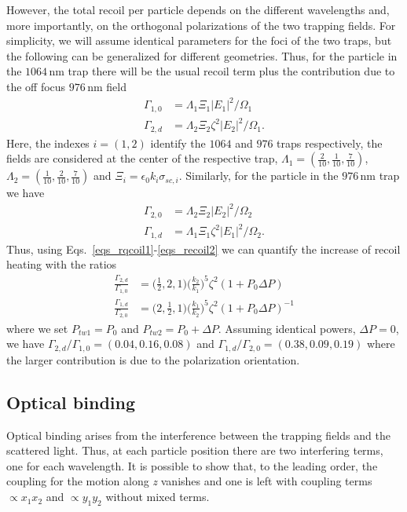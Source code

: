 \documentclass[aps,PRA,%
 amsmath,amssymb,
singlecolumn,
notitlepage,superscriptaddress,groupedaddress]{revtex4}
\begin{document}
However, the total recoil per particle depends on the different wavelengths and, more importantly, on the orthogonal polarizations of the two trapping fields. For simplicity, we will assume identical parameters for the foci of the two traps, but the following can be generalized for different geometries. Thus, for the particle in the $1064$\,nm trap there  will be the usual recoil term plus the contribution due to the off focus $976$\,nm field
\begin{equation}\label{eqs_rqcoil1}
\begin{split}
    \Gamma_{1,0}&= \Lambda_1 \Xi_1 |E_1|^2/\Omega_1     \\
    \Gamma_{2,d}&=\Lambda_2 \Xi_2 \zeta^2 |E_2|^2/\Omega_1.  
\end{split}
\end{equation}
Here, the indexes $i=(1,2)$ identify the $1064$ and  $976$ traps respectively, the fields are considered at the center of the respective trap, $\Lambda_1=(\frac{2}{10},\frac{1}{10},\frac{7}{10})$, $\Lambda_2=(\frac{1}{10},\frac{2}{10},\frac{7}{10})$ and $\Xi_i=\epsilon_0 k_i \sigma_{sc,i}$. Similarly, for the particle in the $976$\,nm trap we have
\begin{equation}
    \begin{split}\label{eqs_recoil2}
    \Gamma_{2,0}&= \Lambda_2 \Xi_2 |E_2|^2/\Omega_2     \\
    \Gamma_{1,d}&=\Lambda_1 \Xi_1 \zeta^2 |E_1|^2/\Omega_2.  
\end{split}
\end{equation}
Thus, using Eqs.~\ref{eqs_rqcoil1}-\ref{eqs_recoil2} we can quantify the increase of recoil heating with the ratios
\begin{equation}
\begin{split}
    \frac{\Gamma_{2,d}}{\Gamma_{1,0}}&=\bigg(\frac{1}{2},2,1\bigg)\bigg(\frac{k_2}{k_1}\bigg)^5\zeta^2 (1+P_0 \Delta P) \\
     \frac{\Gamma_{1,d}}{\Gamma_{2,0}}&=\bigg(2,\frac{1}{2},1\bigg)\bigg(\frac{k_1}{k_2}\bigg)^5\zeta^2 (1+P_0 \Delta P)^{-1}
\end{split}
\end{equation}
\noindent where we set $P_{tw1}=P_0$ and $P_{tw2}=P_0+\Delta P$. Assuming identical powers, $\Delta P=0$,  we have $\Gamma_{2,d}/\Gamma_{1,0}=(0.04,0.16,0.08)$ and $\Gamma_{1,d}/\Gamma_{2,0}=(0.38,0.09,0.19)$ where the larger contribution is due to the polarization orientation.
    
\subsection{Optical binding}
Optical binding arises from the interference between the trapping fields and the scattered light. Thus, 
at each particle position there are two interfering terms, one for each wavelength. It is possible to show that, to the leading order, the coupling for the motion along \emph{z} vanishes and one is left with coupling terms $\propto x_1 x_2$ and $\propto y_1 y_2$ without mixed terms.
\end{document}
